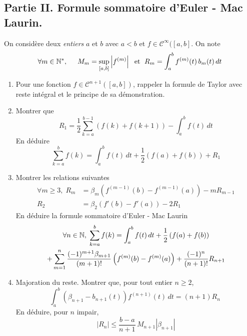 \subsection*{Partie II. Formule sommatoire d'Euler - Mac Laurin.}
On considère deux \emph{entiers} $a$ et $b$ avec $a<b$ et $f \in\mathcal{C}^{\infty}([a,b]$. On note
\begin{displaymath}
\forall m\in \mathbb{N}^*, \hspace{0.5cm} M_{m} = \sup_{[a,b]}\left| f^{(m)}\right|
\; \text{ et } \;
R_{m} = \int_a^bf^{(m)}(t)\,b_{m}(t)\, dt  
\end{displaymath}

\begin{enumerate}
  \item Pour une fonction $f\in \mathcal{C}^{n+1}([a,b])$, rappeler la formule de Taylor avec reste intégral et le principe de sa démonstration.
  \item Montrer que 
\begin{displaymath}
R_1 = \frac{1}{2}\sum_{k=a}^{b-1}\left( f(k)+f(k+1)\right) - \int_a^bf(t)\,dt   
\end{displaymath}
En déduire
\begin{displaymath}
  \sum_{k=a}^bf(k) = \int_a^bf(t)\,dt +\frac{1}{2}\left( f(a)+f(b)\right) + R_1
\end{displaymath}

\item Montrer les relations suivantes
\begin{align*}
  \forall m\geq 3, \; R_m &= \beta_m\left(f^{(m-1)}(b) -f^{(m-1)}(a) \right) - mR_{m-1} \\ 
  R_2 &= \beta_2\left(f'(b) -f'(a) \right) - 2R_{1}
\end{align*}
En déduire la formule sommatoire d'Euler - Mac Laurin
\begin{multline*}
\forall n \in \mathbb{N},\;  \sum_{k=a}^bf(k) 
= \int_a^bf(t)\,dt  +\frac{1}{2}\left( f(a)+f(b)\right) \\
+\sum_{m=1}^n \frac{(-1)^{m+1}\beta_{m+1}}{(m+1)!}\left( f^{(m)}(b)-f^{(m)}(a)\right) 
+ \frac{(-1)^{n}}{(n+1)!}R_{n+1}
\end{multline*}

 \item  Majoration du reste. Montrer que, pour tout entier $n\geq 2$,
\begin{displaymath}
 \int_a^b\left(\beta_{n+1}-b_{n+1}(t) \right) f^{(n+1)}(t)\,dt = (n+1) R_n \;
\end{displaymath} 
En déduire, pour $n$ impair,
\begin{displaymath}
  |R_{n}|\leq \frac{b-a}{n+1}\, M_{n+1} |\beta_{n+1}|
\end{displaymath}


\end{enumerate}
